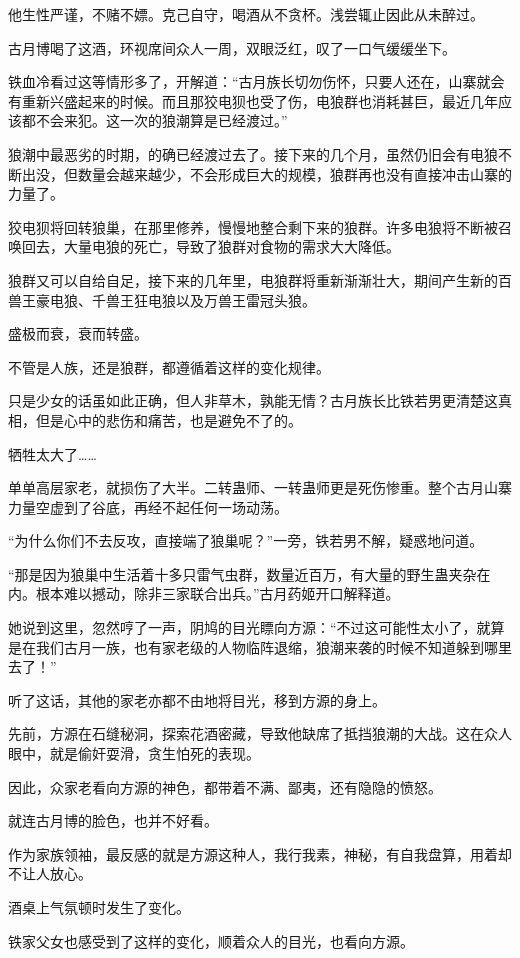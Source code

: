 \begin{this_body}
他生性严谨，不赌不嫖。克己自守，喝酒从不贪杯。浅尝辄止因此从未醉过。

古月博喝了这酒，环视席间众人一周，双眼泛红，叹了一口气缓缓坐下。

铁血冷看过这等情形多了，开解道：“古月族长切勿伤怀，只要人还在，山寨就会有重新兴盛起来的时候。而且那狡电狈也受了伤，电狼群也消耗甚巨，最近几年应该都不会来犯。这一次的狼潮算是已经渡过。”

狼潮中最恶劣的时期，的确已经渡过去了。接下来的几个月，虽然仍旧会有电狼不断出没，但数量会越来越少，不会形成巨大的规模，狼群再也没有直接冲击山寨的力量了。

狡电狈将回转狼巢，在那里修养，慢慢地整合剩下来的狼群。许多电狼将不断被召唤回去，大量电狼的死亡，导致了狼群对食物的需求大大降低。

狼群又可以自给自足，接下来的几年里，电狼群将重新渐渐壮大，期间产生新的百兽王豪电狼、千兽王狂电狼以及万兽王雷冠头狼。

盛极而衰，衰而转盛。

不管是人族，还是狼群，都遵循着这样的变化规律。

只是少女的话虽如此正确，但人非草木，孰能无情？古月族长比铁若男更清楚这真相，但是心中的悲伤和痛苦，也是避免不了的。

牺牲太大了……

单单高层家老，就损伤了大半。二转蛊师、一转蛊师更是死伤惨重。整个古月山寨力量空虚到了谷底，再经不起任何一场动荡。

“为什么你们不去反攻，直接端了狼巢呢？”一旁，铁若男不解，疑惑地问道。

“那是因为狼巢中生活着十多只雷气虫群，数量近百万，有大量的野生蛊夹杂在内。根本难以撼动，除非三家联合出兵。”古月药姬开口解释道。

她说到这里，忽然哼了一声，阴鸠的目光瞟向方源：“不过这可能性太小了，就算是在我们古月一族，也有家老级的人物临阵退缩，狼潮来袭的时候不知道躲到哪里去了！”

听了这话，其他的家老亦都不由地将目光，移到方源的身上。

先前，方源在石缝秘洞，探索花酒密藏，导致他缺席了抵挡狼潮的大战。这在众人眼中，就是偷奸耍滑，贪生怕死的表现。

因此，众家老看向方源的神色，都带着不满、鄙夷，还有隐隐的愤怒。

就连古月博的脸色，也并不好看。

作为家族领袖，最反感的就是方源这种人，我行我素，神秘，有自我盘算，用着却不让人放心。

酒桌上气氛顿时发生了变化。

铁家父女也感受到了这样的变化，顺着众人的目光，也看向方源。


\end{this_body}

